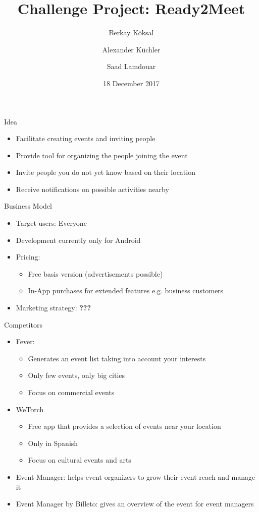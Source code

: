 \documentclass[logo=EURECOM,english]{eurecombeamer}
\date{18 December 2017}
\title{Challenge Project: Ready2Meet}
\author{Berkay K\"oksal \and Alexander K\"uchler \and Saad Lamdouar}
\institute{\EURECOMname}
\newcommand{\todo}[1]{\textbf{\color{red} #1}}
\begin{document}
\maketitleframeEURECOM

\begin{frame}{Idea}
\begin{itemize}
\item Facilitate creating events and inviting people
\item Provide tool for organizing the people joining the event
\item Invite people you do not yet know based on their location
\item Receive notifications on possible activities nearby
\end{itemize}
\end{frame}

\begin{frame}{Business Model}
\begin{itemize}
\item Target users: Everyone
\item Development currently only for Android
\item Pricing:
	\begin{itemize}
	\item Free basis version (advertisements possible)
	\item In-App purchases for extended features e.g. business customers
	\end{itemize}
\item Marketing strategy: \todo{???}
\end{itemize}
\end{frame}

\begin{frame}{Competitors}
\begin{itemize}
\item Fever:
	\begin{itemize}
	\item Generates an event list taking into account your interests
	\item Only few events, only big cities
	\item Focus on commercial events
	\end{itemize}
\item WeTorch
	\begin{itemize}
	\item Free app that provides a selection of events near your location
	\item Only in Spanish
	\item Focus on cultural events and arts
	\end{itemize}
\item Event Manager: helps event organizers to grow their event reach and manage it
\item Event Manager by Billeto: gives an overview of the event for event managers
\end{itemize}
\end{frame}
\end{document}
